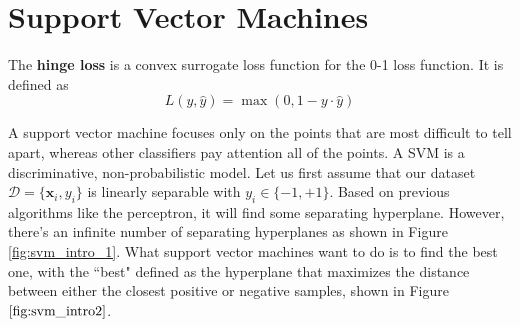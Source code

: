 \section{Support Vector Machines}

  \begin{definition}
    The \textbf{hinge loss} is a convex surrogate loss function for the 0-1 loss function. It is defined as 
    \begin{equation}
      L(y, \hat{y}) = \max(0, 1 - y \cdot \hat{y})
    \end{equation}
  \end{definition}

  A support vector machine focuses only on the points that are most difficult to tell apart, whereas other classifiers pay attention all of the points. A SVM is a discriminative, non-probabilistic model. Let us first assume that our dataset $\mathcal{D} = \{\mathbf{x}_i, y_i\}$ is linearly separable with $y_i \in \{-1, +1\}$. Based on previous algorithms like the perceptron, it will find some separating hyperplane. However, there's an infinite number of separating hyperplanes as shown in Figure \ref{fig:svm_intro_1}. What support vector machines want to do is to find the best one, with the ``best" defined as the hyperplane that maximizes the distance between either the closest positive or negative samples, shown in Figure $\ref{fig:svm_intro2}$.  


